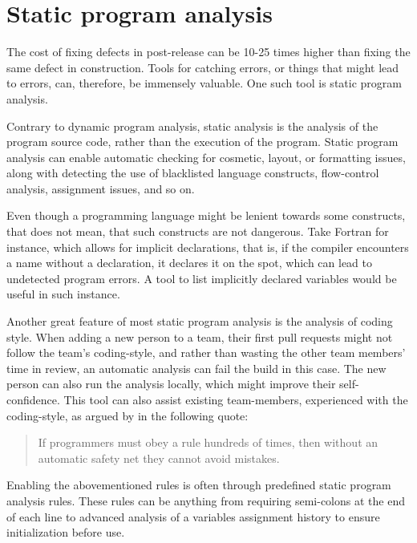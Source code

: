 \section{Static program analysis} \label{sec:linter}

The cost of fixing defects in post-release can be 10-25 times higher than fixing the same defect in construction\cite[p.~29]{mcconnell_code_2004}. Tools for catching errors, or things that might lead to errors, can, therefore, be immensely valuable. One such tool is static program analysis.

Contrary to dynamic program analysis, static analysis is the analysis of the program source code, rather than the execution of the program\cite{wichmann_industrial_1995}. Static program analysis can enable automatic checking for cosmetic, layout, or formatting issues, along with detecting the use of blacklisted language constructs, flow-control analysis, assignment issues, and so on\cite{wichmann_industrial_1995}. 

Even though a programming language might be lenient towards some constructs, that does not mean, that such constructs are not dangerous. Take Fortran for instance, which allows for implicit declarations, that is, if the compiler encounters a name without a declaration, it declares it on the spot, which can lead to undetected program errors\cite{wichmann_industrial_1995}. A tool to list implicitly declared variables would be useful in such instance.

Another great feature of most static program analysis is the analysis of coding style. When adding a new person to a team, their first pull requests might not follow the team's coding-style, and rather than wasting the other team members' time in review, an automatic analysis can fail the build in this case. The new person can also run the analysis locally, which might improve their self-confidence. This tool can also assist existing team-members, experienced with the coding-style, as argued by \cite{bessey_few_2010} in the following quote:

\begin{quote}
    If programmers must obey a rule hundreds of times, then without an automatic safety net they cannot avoid mistakes.\cite{bessey_few_2010}
\end{quote}

Enabling the abovementioned rules is often through predefined static program analysis rules\cite{bessey_few_2010}. These rules can be anything from requiring semi-colons at the end of each line to advanced analysis of a variables assignment history to ensure initialization before use.

